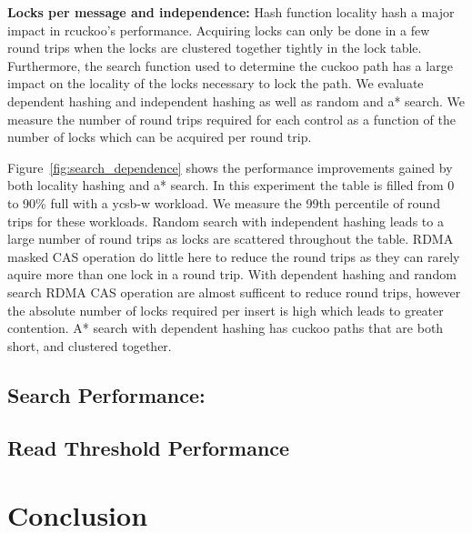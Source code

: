 \textbf{Locks per message and independence:} Hash function
locality hash a major impact in rcuckoo's performance.
Acquiring locks can only be done in a few round trips when
the locks are clustered together tightly in the lock table.
Furthermore, the search function used to determine the
cuckoo path has a large impact on the locality of the locks
necessary to lock the path. We evaluate dependent hashing
and independent hashing as well as random and a* search. We
measure the number of round trips required for each control
as a function of the number of locks which can be acquired
per round trip.

Figure~\ref{fig:search_dependence} shows the performance
improvements gained by both locality hashing and a* search.
In this experiment the table is filled from 0 to 90\% full
with a ycsb-w workload. We measure the 99th percentile of
round trips for these workloads. Random search with
independent hashing leads to a large number of round trips
as locks are scattered throughout the table. RDMA masked CAS
operation do little here to reduce the round trips as they
can rarely aquire more than one lock in a round trip. With
dependent hashing and random search RDMA CAS operation are
almost sufficent to reduce round trips, however the absolute
number of locks required per insert is high which leads to
greater contention. A* search with dependent hashing has
cuckoo paths that are both short, and clustered together.



\subsection{Search Performance:}



\subsection{Read Threshold Performance} 



\section{Conclusion}
\label{sec:conclusion}
